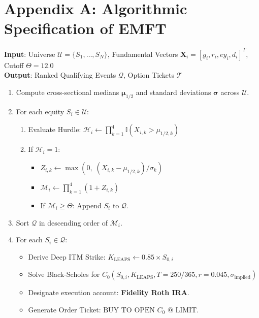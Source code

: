 \documentclass[11pt]{article}
\begin{document}
\section*{Appendix A: Algorithmic Specification of EMFT}

\begin{tcolorbox}[colback=white,colframe=darkslate,title=\textbf{Algorithm 1: Extremized Multiplier Scoring \& Options Overlay},fonttitle=\small\bfseries\color{white}]
\small
\textbf{Input}: Universe $\mathcal{U} = \{S_1, \dots, S_N\}$, Fundamental Vectors $\bm{X}_i = [g_i, r_i, ey_i, d_i]^T$, Cutoff $\Theta = 12.0$\\
\textbf{Output}: Ranked Qualifying Events $\mathcal{Q}$, Option Tickets $\mathcal{T}$
\begin{enumerate}[label=\arabic*.]
    \item Compute cross-sectional medians $\bm{\mu}_{1/2}$ and standard deviations $\bm{\sigma}$ across $\mathcal{U}$.
    \item For each equity $S_i \in \mathcal{U}$:
    \begin{enumerate}[label=(\alph*)]
        \item Evaluate Hurdle: $\mathcal{H}_i \leftarrow \prod_{k=1}^4 \mathbb{I}(X_{i,k} > \mu_{1/2,k})$
        \item If $\mathcal{H}_i = 1$:
        \begin{itemize}
            \item $Z_{i,k} \leftarrow \max(0, \; (X_{i,k} - \mu_{1/2,k}) / \sigma_k)$
            \item $\mathcal{M}_i \leftarrow \prod_{k=1}^4 (1 + Z_{i,k})$
            \item If $\mathcal{M}_i \ge \Theta$: Append $S_i$ to $\mathcal{Q}$.
        \end{itemize}
    \end{enumerate}
    \item Sort $\mathcal{Q}$ in descending order of $\mathcal{M}_i$.
    \item For each $S_i \in \mathcal{Q}$:
    \begin{itemize}
        \item Derive Deep ITM Strike: $K_{\text{LEAPS}} \leftarrow 0.85 \times S_{0,i}$
        \item Solve Black-Scholes for $C_0(S_{0,i}, K_{\text{LEAPS}}, T=250/365, r=0.045, \sigma_{\text{implied}})$
        \item Designate execution account: \textbf{Fidelity Roth IRA}.
        \item Generate Order Ticket: $\text{BUY TO OPEN } C_0 \text{ @ LIMIT}$.
    \end{itemize}
\end{enumerate}
\end{tcolorbox}
\end{document}
